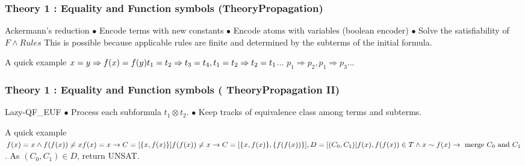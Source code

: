 \documentclass[pdf]{beamer}
\begin{document}
\begin{frame}
\frametitle{Theory 1 : Equality and Function symbols (TheoryPropagation)}

\begin{block}{Ackermann's reduction}
$\bullet$ Encode terms with new constants\newline
$\bullet$ Encode atoms with variables (boolean encoder) \newline
$\bullet$ Solve the satisfiability of $F \wedge Rules$ \newline
This is possible because applicable rules are finite and determined by the subterms of the initial formula.
\end{block}

\begin{exampleblock}{A quick example}
$x=y \Rightarrow f(x)=f(y)\newline
t_1=t_2 \Rightarrow t_3=t_4, t_1=t_2 \Rightarrow t_2=t_1$... \newline 
$p_1 \Rightarrow p_2, p_1 \Rightarrow p_3$...
\end{exampleblock}

\end{frame}

\begin{frame}
\frametitle{Theory 1 : Equality and Function symbols (	TheoryPropagation II)}

\begin{block}{Lazy-QF\_EUF}
$\bullet$ Process each subformula $t_1 \otimes t_2$.\newline
$\bullet$ Keep tracks of equivalence class among terms and subterms.\newline
\end{block}

\begin{exampleblock}{A quick example}
$f(x)=x \wedge f(f(x)) \neq x \newline
f(x)=x \rightarrow C=[\{x,f(x)\}]\newline
f(f(x)) \neq x \rightarrow C=[\{x,f(x)\},\{f(f(x))\}],D=[(C_0,C_1)]\newline
f(x),f(f(x)) \in T \wedge x \sim f(x) \rightarrow \text{ merge } C_0 \text{ and } C_1$. \newline
As $(C_0,C_1) \in D$, return UNSAT.
\end{exampleblock}

\end{frame}
\end{document}
